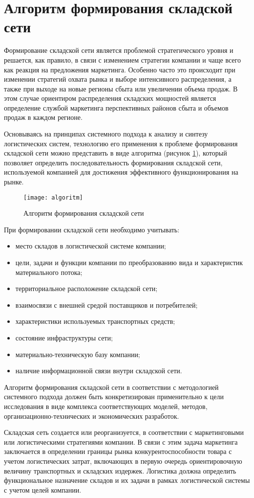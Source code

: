 \section{Алгоритм формирования складской сети}

Формирование складской сети является проблемой стратегического уровня и решается, как правило, в связи с изменением стратегии компании и чаще всего как реакция на предложения маркетинга.
Особенно часто это происходит при изменении стратегий охвата рынка и выборе интенсивного распределения, а также при выходе на новые регионы сбыта или увеличении объема продаж.
В этом случае ориентиром распределения складских мощностей является определение службой маркетинга перспективных районов сбыта и объемов продаж в каждом регионе.

Основываясь на принципах системного подхода к анализу и синтезу логистических систем, технологию его применения к проблеме формирования складской сети можно представить в виде алгоритма (рисунок \ref{fig:algoritm}), который позволяет определить последовательность формирования складской сети, используемой компанией для достижения эффективного функционирования на рынке.


\begin{figure}[h]
	\centering
	\texttt{[image: algoritm]}
	\caption{Алгоритм формирования складской сети}
	\label{fig:algoritm}
\end{figure}

При формировании складской сети необходимо учитывать:
\begin{itemize}
	\item место складов в логистической системе компании;
	\item цели, задачи и функции компании по преобразованию вида и характеристик материального потока;
	\item территориальное расположение складской сети;
	\item взаимосвязи с внешней средой поставщиков и потребителей;
	\item характеристики используемых транспортных средств;
	\item состояние инфраструктуры сети;
	\item материально-техническую базу компании;
	\item наличие информационной связи внутри складской сети.
\end{itemize}

Алгоритм формирования складской сети в соответствии с методологией системного подхода должен быть конкретизирован применительно к цели исследования в виде комплекса соответствующих моделей, методов, организационно-технических и экономических разработок.

Складская сеть создается или реорганизуется, в соответствии с маркетинговыми или логистическими стратегиями компании.
В связи с этим задача маркетинга заключается в определении границы рынка конкурентоспособности товара с учетом логистических затрат, включающих в первую очередь ориентировочную величину транспортных и складских издержек.
Логистика должна определить функциональное назначение складов и их задачи в рамках логистической системы с учетом целей компании.